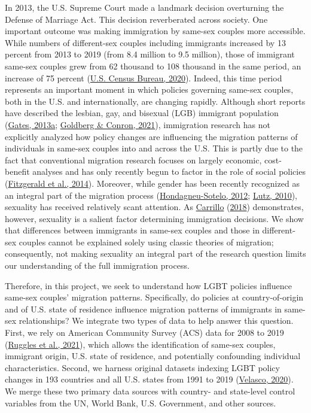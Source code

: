 \documentclass[
  11pt,
]{article}
\begin{document}
In 2013, the U.S. Supreme Court made a landmark decision overturning the Defense of Marriage Act. This decision reverberated across society. One important outcome was making immigration by same-sex couples more accessible. While numbers of different-sex couples including immigrants increased by 13 percent from 2013 to 2019 (from 8.4 million to 9.5 million), those of immigrant same-sex couples grew from 62 thousand to 108 thousand in the same period, an increase of 75 percent (\protect\hyperlink{ref-u.s.censusbureau_2020}{U.S. Census Bureau, 2020}). Indeed, this time period represents an important moment in which policies governing same-sex couples, both in the U.S. and internationally, are changing rapidly. Although short reports have described the lesbian, gay, and bisexual (LGB) immigrant population (\protect\hyperlink{ref-gates_2013}{Gates, 2013a}; \protect\hyperlink{ref-goldberg_2021}{Goldberg \& Conron, 2021}), immigration research has not explicitly analyzed how policy changes are influencing the migration patterns of individuals in same-sex couples into and across the U.S. This is partly due to the fact that conventional migration research focuses on largely economic, cost-benefit analyses and has only recently begun to factor in the role of social policies (\protect\hyperlink{ref-fitzgerald_2014}{Fitzgerald et al., 2014}). Moreover, while gender has been recently recognized as an integral part of the migration process (\protect\hyperlink{ref-hondagneu-sotelo_2012}{Hondagneu-Sotelo, 2012}; \protect\hyperlink{ref-lutz_2010}{Lutz, 2010}), sexuality has received relatively scant attention. As \protect\hyperlink{ref-carrillo_2018}{Carrillo} (\protect\hyperlink{ref-carrillo_2018}{2018}) demonstrates, however, sexuality is a salient factor determining immigration decisions. We show that differences between immigrants in same-sex couples and those in different-sex couples cannot be explained solely using classic theories of migration; consequently, not making sexuality an integral part of the research question limits our understanding of the full immigration process.

Therefore, in this project, we seek to understand how LGBT policies influence same-sex couples' migration patterns. Specifically, do policies at country-of-origin and of U.S. state of residence influence migration patterns of immigrants in same-sex relationships? We integrate two types of data to help answer this question. First, we rely on American Community Survey (ACS) data for 2008 to 2019 (\protect\hyperlink{ref-ruggles_2021}{Ruggles et al., 2021}), which allows the identification of same-sex couples, immigrant origin, U.S. state of residence, and potentially confounding individual characteristics. Second, we harness original datasets indexing LGBT policy changes in 193 countries and all U.S. states from 1991 to 2019 (\protect\hyperlink{ref-velasco_2020}{Velasco, 2020}). We merge these two primary data sources with country- and state-level control variables from the UN, World Bank, U.S. Government, and other sources.
\end{document}
